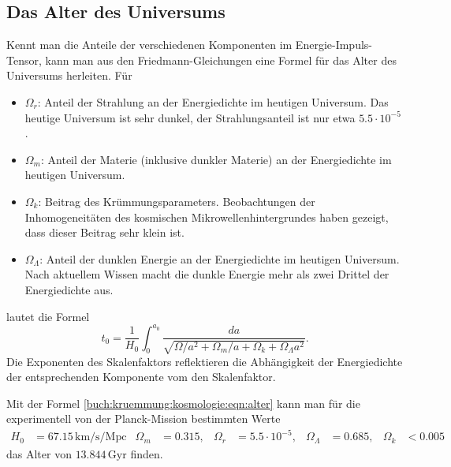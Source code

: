 %
%
\subsection{Das Alter des Universums}
Kennt man die Anteile der verschiedenen Komponenten im
Energie-Impuls-Tensor, kann man aus den Friedmann-Gleichungen eine
Formel für das Alter des Universums herleiten.
Für
\begin{itemize}
\item
$\Omega_r$: Anteil der Strahlung an der Energiedichte im heutigen
Universum.
Das heutige Universum ist sehr dunkel, der Strahlungsanteil ist
nur etwa $5.5\cdot10^{-5}$.
\item
$\Omega_m$: Anteil der Materie (inklusive dunkler Materie) an der
Energiedichte im heutigen Universum.
\item
$\Omega_k$: Beitrag des Krümmungsparameters.
Beobachtungen der Inhomogeneitäten des kosmischen Mikrowellenhintergrundes
haben gezeigt, dass dieser Beitrag sehr klein ist.
\item
$\Omega_\Lambda$: Anteil der dunklen Energie an der Energiedichte im 
heutigen Universum.
Nach aktuellem Wissen macht die dunkle Energie mehr als zwei Drittel
der Energiedichte aus.
\end{itemize}
lautet die Formel
\begin{equation}
t_0
=
\frac{1}{H_0}
\int_0^{a_0}
\frac{da}{\!\sqrt{\Omega/a^2 + \Omega_m/a + \Omega_k + \Omega_\Lambda a^2}}.
\label{buch:kruemmung:kosmologie:eqn:alter}
\end{equation}
Die Exponenten des Skalenfaktors reflektieren die Abhängigkeit 
der Energiedichte der entsprechenden Komponente vom den Skalenfaktor.

Mit der Formel
\eqref{buch:kruemmung:kosmologie:eqn:alter}
kann man für die experimentell von der Planck-Mission bestimmten Werte
\begin{align*}
H_0 &= 67.15\,\textrm{km/s/Mpc} &
\Omega_m &= 0.315,&
\Omega_r &= 5.5\cdot 10^{-5},&
\Omega_\Lambda &= 0.685,&
\Omega_k &< 0.005
\end{align*}
das Alter von $13.844\,\textrm{Gyr}$ finden.


